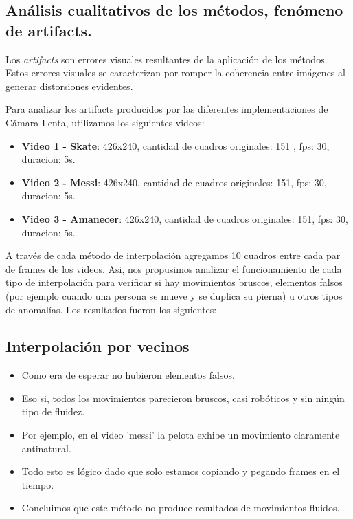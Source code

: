 \subsection{Análisis cualitativos de los métodos, fenómeno de artifacts.}
Los \textit{artifacts} son errores visuales resultantes de la aplicación de los métodos. Estos errores visuales se caracterizan por romper la coherencia entre imágenes al generar distorsiones evidentes.

Para analizar los artifacts producidos por las diferentes implementaciones de Cámara Lenta, utilizamos los siguientes videos:

\begin{itemize}
  \item \textbf{Video 1 - Skate}: 426x240, cantidad de cuadros originales: 151 , fps: 30, duracion: 5s.
  \item \textbf{Video 2 - Messi}: 426x240, cantidad de cuadros originales: 151, fps: 30, duracion: 5s.
  \item \textbf{Video 3 - Amanecer}: 426x240, cantidad de cuadros originales: 151, fps: 30, duracion: 5s.
\end{itemize}

A través de cada método de interpolación agregamos 10 cuadros entre cada par de frames de los videos.
Asi, nos propusimos analizar el funcionamiento de cada tipo de interpolación para verificar si hay movimientos bruscos, elementos falsos (por ejemplo cuando una persona se mueve y se duplica su pierna) u otros tipos de anomalías.
Los resultados fueron los siguientes:

\subsection{Interpolación por vecinos}

\begin{itemize}
\item Como era de esperar no hubieron elementos falsos.
\item Eso si, todos los movimientos parecieron bruscos, casi robóticos y sin ningún tipo de fluidez.
\item Por ejemplo, en el video 'messi' la pelota exhibe un movimiento claramente antinatural.
\item Todo esto es lógico dado que solo estamos copiando y pegando frames en el tiempo.
\item Concluimos que este método no produce resultados de movimientos fluidos.
\end{itemize}

